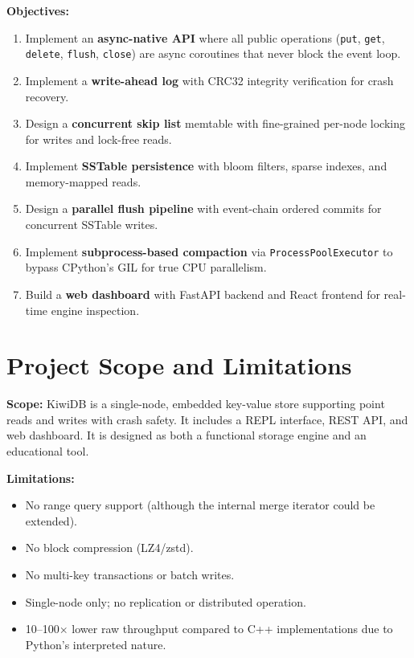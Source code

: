 \documentclass[oneside,a4paper,12pt]{book}
\begin{document}
\textbf{Objectives:}
\begin{enumerate}[leftmargin=2em]
    \item Implement an \textbf{async-native API} where all public operations (\texttt{put}, \texttt{get}, \texttt{delete}, \texttt{flush}, \texttt{close}) are async coroutines that never block the event loop.
    \item Implement a \textbf{write-ahead log} with CRC32 integrity verification for crash recovery.
    \item Design a \textbf{concurrent skip list} memtable with fine-grained per-node locking for writes and lock-free reads.
    \item Implement \textbf{SSTable persistence} with bloom filters, sparse indexes, and memory-mapped reads.
    \item Design a \textbf{parallel flush pipeline} with event-chain ordered commits for concurrent SSTable writes.
    \item Implement \textbf{subprocess-based compaction} via \texttt{ProcessPoolExecutor} to bypass CPython's GIL for true CPU parallelism.
    \item Build a \textbf{web dashboard} with FastAPI backend and React frontend for real-time engine inspection.
\end{enumerate}

\section{Project Scope and Limitations}

\textbf{Scope:} KiwiDB is a single-node, embedded key-value store supporting point reads and writes with crash safety. It includes a REPL interface, REST API, and web dashboard. It is designed as both a functional storage engine and an educational tool.

\textbf{Limitations:}
\begin{itemize}[leftmargin=2em]
    \item No range query support (although the internal merge iterator could be extended).
    \item No block compression (LZ4/zstd).
    \item No multi-key transactions or batch writes.
    \item Single-node only; no replication or distributed operation.
    \item 10--100$\times$ lower raw throughput compared to C++ implementations due to Python's interpreted nature.
\end{itemize}
\end{document}
